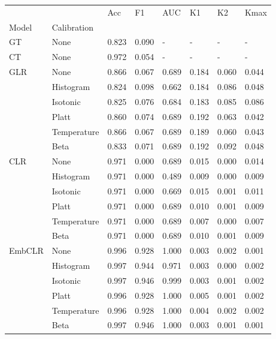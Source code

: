 \begin{tabular}{llllllll}
\toprule
 &  & Acc & F1 & AUC & K1 & K2 & Kmax \\
Model & Calibration &  &  &  &  &  &  \\
\midrule
GT & None & 0.823 & 0.090 & - & - & - & - \\
\cline{1-8}
CT & None & 0.972 & 0.054 & - & - & - & - \\
\cline{1-8}
\multirow[t]{6}{*}{GLR} & None & 0.866 & 0.067 & 0.689 & 0.184 & 0.060 & 0.044 \\
 & Histogram & 0.824 & 0.098 & 0.662 & 0.184 & 0.086 & 0.048 \\
 & Isotonic & 0.825 & 0.076 & 0.684 & 0.183 & 0.085 & 0.086 \\
 & Platt & 0.860 & 0.074 & 0.689 & 0.192 & 0.063 & 0.042 \\
 & Temperature & 0.866 & 0.067 & 0.689 & 0.189 & 0.060 & 0.043 \\
 & Beta & 0.833 & 0.071 & 0.689 & 0.192 & 0.092 & 0.048 \\
\cline{1-8}
\multirow[t]{6}{*}{CLR} & None & 0.971 & 0.000 & 0.689 & 0.015 & 0.000 & 0.014 \\
 & Histogram & 0.971 & 0.000 & 0.489 & 0.009 & 0.000 & 0.009 \\
 & Isotonic & 0.971 & 0.000 & 0.669 & 0.015 & 0.001 & 0.011 \\
 & Platt & 0.971 & 0.000 & 0.689 & 0.010 & 0.001 & 0.009 \\
 & Temperature & 0.971 & 0.000 & 0.689 & 0.007 & 0.000 & 0.007 \\
 & Beta & 0.971 & 0.000 & 0.689 & 0.010 & 0.001 & 0.009 \\
\cline{1-8}
\multirow[t]{6}{*}{EmbCLR} & None & 0.996 & 0.928 & 1.000 & 0.003 & 0.002 & 0.001 \\
 & Histogram & 0.997 & 0.944 & 0.971 & 0.003 & 0.000 & 0.002 \\
 & Isotonic & 0.997 & 0.946 & 0.999 & 0.003 & 0.001 & 0.002 \\
 & Platt & 0.996 & 0.928 & 1.000 & 0.005 & 0.001 & 0.002 \\
 & Temperature & 0.996 & 0.928 & 1.000 & 0.004 & 0.002 & 0.002 \\
 & Beta & 0.997 & 0.946 & 1.000 & 0.003 & 0.001 & 0.001 \\
\cline{1-8}
\bottomrule
\end{tabular}
